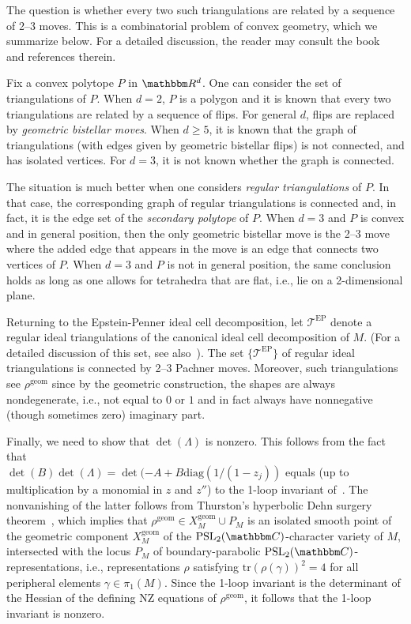 \documentclass[12pt,reqno]{amsart}
\theoremstyle{definition}
\def\BR{\mathbbm R}
\def\BC{\mathbbm C}
\def\calT{\mathcal T}
\def\PSL{\mathrm{PSL}}
\def\diag{\mathrm{diag}}
\def\geom{\mathrm{geom}}
\renewcommand{\=}{\;=\;}
\begin{document}
The question is whether every two such triangulations are related by a sequence of
2--3 moves. This is a combinatorial problem of convex geometry, which we summarize
below. For a detailed discussion, the reader may consult the book~\cite{LRS}
and references therein.

Fix a convex polytope $P$ in $\BR^d$. One can consider the set of
triangulations of $P$. When $d=2$, $P$ is a polygon and it is known that 
every two triangulations are related by a sequence of flips. For general
$d$, flips are replaced by {\em geometric bistellar moves}. When $d \geq 5$,
it is known that the graph of triangulations (with edges given
by geometric bistellar flips) is not connected, and has isolated vertices.
For $d=3$, it is not known whether the graph is connected.

The situation is much better when one considers {\em regular triangulations}
of $P$. In that case, the corresponding graph of regular triangulations
is connected and, in fact, it is the edge set of the {\em secondary polytope} of
$P$. When $d=3$ and $P$ is convex and in general position, then the only
geometric bistellar move is the 2--3 move where the added edge that appears in
the move is an edge that connects two vertices of $P$. When $d=3$ and $P$ is
not in general position, the same conclusion holds as long as one allows for
tetrahedra that are flat, i.e., lie on a 2-dimensional plane.

Returning to the Epstein-Penner ideal cell decomposition, let $\calT^{\mathrm{EP}}$
denote a regular ideal triangulations of the canonical ideal cell decomposition
of $M$. (For a detailed discussion of this set, see also~\cite[Sec.6]{GHRS}).
The set $\{\calT^{\mathrm{EP}}\}$ of regular ideal triangulations
is connected by 2--3 Pachner moves. Moreover, such triangulations see $\rho^\geom$
since by the geometric construction, the shapes are always nondegenerate, i.e.,
not equal to $0$ or $1$ and in fact always have nonnegative
(though sometimes zero) imaginary part.

Finally, we need to show that $\det(\Lambda)$ is nonzero. This follows from the
fact that\\ $\det(B)\det(\Lambda)=\det(-A+B\diag(1/(1-z_j))$ equals (up to
multiplication by a monomial in $z$ and $z''$) to the 1-loop invariant
of~\cite[Sec.1.3]{DG}. The nonvanishing of the latter follows from
Thurston's hyperbolic Dehn surgery theorem~\cite{Th}, which implies that
$\rho^\geom \in X_M^\geom \cup P_M$ is an isolated smooth point of the geometric
component $X^\geom_M$ of the $\PSL_2(\BC)$-character variety of $M$, intersected
with the locus $P_M$ of boundary-parabolic $\PSL_2(\BC)$-representations, i.e.,
representations $\rho$ satisfying $\mathrm{tr}(\rho(\gamma))^2=4$ for all peripheral
elements $\gamma \in \pi_1(M)$. 
Since the 1-loop invariant is the determinant of the Hessian of the defining
NZ equations of $\rho^\geom$, it follows that the 1-loop invariant is nonzero. 
\end{document}

